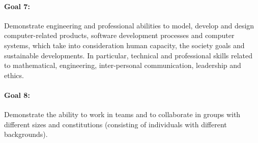 %


%
%
%

\paragraph{Goal 7:} Demonstrate engineering and professional abilities
to model, develop and design computer-related products, software
development processes and computer systems, which take into
consideration human capacity, the society goals and sustainable
developments. In particular, technical and professional skills related
to mathematical, engineering, inter-personal communication, leadership
and ethics.

%
%

\paragraph{Goal 8:} Demonstrate the ability to work in teams and to
collaborate in groups with different sizes and constitutions
(consisting of individuals with different backgrounds).


